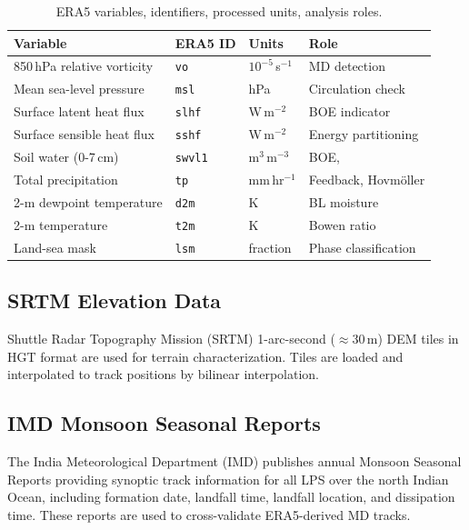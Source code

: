 \begin{table}[h]
  \centering
  \caption[Summary of ERA5 variables]{ERA5 variables, identifiers,
  processed units, analysis roles.}
  \label{tab:variables_summary}
  \begin{tabular}{l l l l}
    \toprule
    \textbf{Variable} & \textbf{ERA5 ID} & \textbf{Units} & \textbf{Role} \\
    \midrule
    850\,hPa relative vorticity & \texttt{vo}     &
    $10^{-5}$\,s$^{-1}$  & MD detection \\
    Mean sea-level pressure      & \texttt{msl}    & hPa
    & Circulation check \\
    Surface latent heat flux     & \texttt{slhf}   & W\,m$^{-2}$
    & BOE indicator \\
    Surface sensible heat flux   & \texttt{sshf}   & W\,m$^{-2}$
    & Energy partitioning \\
    Soil water (0-7\,cm)        & \texttt{swvl1}  & m$^3$\,m$^{-3}$
    & BOE, \\
    Total precipitation          & \texttt{tp}     & mm\,hr$^{-1}$
    & Feedback, Hovmöller \\
    2-m dewpoint temperature     & \texttt{d2m}    & K
    & BL moisture \\
    2-m temperature              & \texttt{t2m}    & K
    & Bowen ratio \\
    Land-sea mask                & \texttt{lsm}    & fraction
    & Phase classification \\
    \bottomrule
  \end{tabular}
\end{table}

\subsection{SRTM Elevation Data}
\label{subsec:srtm}

Shuttle Radar Topography Mission (SRTM) 1-arc-second ($\approx
30$\,m) DEM tiles in HGT format are used for terrain
characterization. Tiles are loaded and interpolated to track
positions by bilinear interpolation.

\subsection{IMD Monsoon Seasonal Reports}
\label{subsec:imd_data}

The India Meteorological Department (IMD) publishes annual Monsoon
Seasonal Reports providing synoptic track information for all LPS
over the north Indian Ocean, including formation date, landfall time,
landfall location, and dissipation time. These reports are used to
cross-validate ERA5-derived MD tracks.

